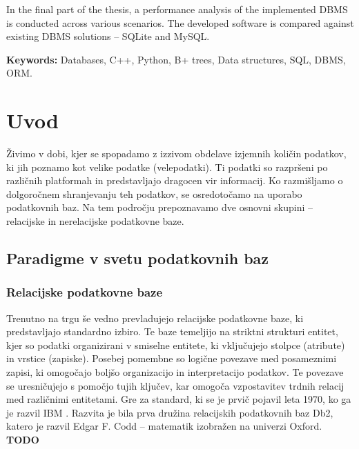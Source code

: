 \documentclass[a4paper,12pt,openright]{book}
\newcommand{\tkeywordsEn}{Databases, C++, Python, B+ trees, Data structures, SQL, DBMS, ORM}
\newcommand{\clearemptydoublepage}{\newpage{\pagestyle{empty}\cleardoublepage}}
\begin{document}
In the final part of the thesis, a performance analysis of the implemented DBMS is conducted across various scenarios. The developed software is compared against existing DBMS solutions – SQLite and MySQL.
\bigskip

\noindent\textbf{Keywords:} \tkeywordsEn.
\clearemptydoublepage

\mainmatter
\setcounter{page}{1}
\pagestyle{fancy}


\chapter{Uvod}
    Živimo v dobi, kjer se spopadamo z izzivom obdelave izjemnih količin podatkov, ki jih poznamo kot velike podatke (velepodatki). Ti podatki so razpršeni po različnih platformah in predstavljajo dragocen vir informacij. Ko razmišljamo o dolgoročnem shranjevanju teh podatkov, se osredotočamo na uporabo podatkovnih baz. Na tem področju prepoznavamo dve osnovni skupini – relacijske in nerelacijske podatkovne baze.
    \section{Paradigme v svetu podatkovnih baz}
        \subsection{Relacijske podatkovne baze}
        Trenutno na trgu še vedno prevladujejo relacijske podatkovne baze, ki predstavljajo standardno izbiro. Te baze temeljijo na striktni strukturi entitet, kjer so podatki organizirani v smiselne entitete, ki vključujejo stolpce (atribute) in vrstice (zapiske). Posebej pomembne so logične povezave med posameznimi zapisi, ki omogočajo boljšo organizacijo in interpretacijo podatkov. Te povezave se uresničujejo s pomočjo tujih ključev, kar omogoča vzpostavitev trdnih relacij med različnimi entitetami.
        \newline
        \newline
        \noindent
        Gre za standard, ki se je prvič pojavil leta 1970, ko ga je razvil IBM \cite{IBM_DBMS_1970}. Razvita je bila prva družina relacijskih podatkovnih baz Db2, katero je razvil Edgar F. Codd – matematik izobražen na univerzi Oxford.
        \textbf{TODO}
        
\end{document}
